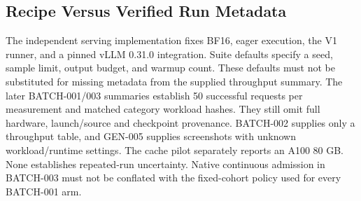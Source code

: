 \subsection{Recipe Versus Verified Run Metadata}
The independent serving implementation fixes BF16, eager execution, the V1
runner, and a pinned vLLM 0.31.0 integration. Suite defaults specify a seed,
sample limit, output budget, and warmup count. These defaults must not be
substituted for missing metadata from the supplied throughput summary.
The later BATCH-001/003 summaries establish 50 successful requests per
measurement and matched category workload hashes. They still omit full hardware,
launch/source and checkpoint provenance. BATCH-002 supplies only a throughput
table, and GEN-005 supplies screenshots with unknown workload/runtime settings.
The cache pilot separately reports an A100 80 GB. None establishes repeated-run
uncertainty. Native continuous admission in BATCH-003 must not be conflated with
the fixed-cohort policy used for every BATCH-001 arm.
